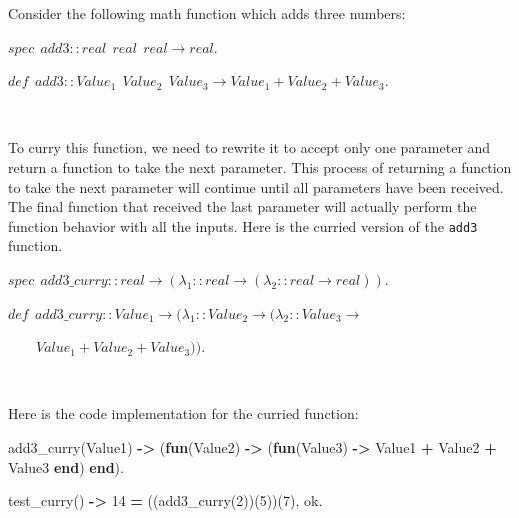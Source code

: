 \documentclass[
]{book}
\newenvironment{Shaded}{\begin{snugshade}}{\end{snugshade}}
\newcommand{\CharTok}[1]{\textcolor[rgb]{0.31,0.60,0.02}{#1}}
\newcommand{\DecValTok}[1]{\textcolor[rgb]{0.00,0.00,0.81}{#1}}
\newcommand{\FunctionTok}[1]{\textcolor[rgb]{0.00,0.00,0.00}{#1}}
\newcommand{\KeywordTok}[1]{\textcolor[rgb]{0.13,0.29,0.53}{\textbf{#1}}}
\newcommand{\OperatorTok}[1]{\textcolor[rgb]{0.81,0.36,0.00}{\textbf{#1}}}
\newcommand{\VariableTok}[1]{\textcolor[rgb]{0.00,0.00,0.00}{#1}}
\begin{document}
Consider the following math function which adds three numbers:

\begin{formulabox}
\(spec ~ ~ add3 :: real ~ ~ real ~ ~ real \rightarrow real.\)

\(de\mathit{f} ~ ~ add3 :: Value_1 ~ ~ Value_2 ~ ~ Value_3 \rightarrow Value_1 + Value_2 + Value_3.\)

\end{formulabox}

\(\nonumber\)

To curry this function, we need to rewrite it to accept only one parameter and return a function to take the next parameter. This process of returning a function to take the next parameter will continue until all parameters have been received. The final function that received the last parameter will actually perform the function behavior with all the inputs. Here is the curried version of the \texttt{add3} function.

\begin{formulabox}
\(spec ~ ~ add3\_curry :: real \rightarrow (\lambda_1 :: real \rightarrow (\lambda_2 :: real \rightarrow real)).\)

\(de\mathit{f} ~ ~ add3\_curry :: Value_1 \rightarrow (\lambda_1 :: Value_2 \rightarrow (\lambda_2 :: Value_3 \rightarrow\)

\(\quad \quad Value_1 + Value_2 + Value_3)).\)

\end{formulabox}

\(\nonumber\)

Here is the code implementation for the curried function:

\begin{Shaded}
\begin{Highlighting}[]
\FunctionTok{add3\_curry(}\VariableTok{Value1}\FunctionTok{)} \OperatorTok{{-}\textgreater{}} \FunctionTok{(}\KeywordTok{fun}\FunctionTok{(}\VariableTok{Value2}\FunctionTok{)} \OperatorTok{{-}\textgreater{}} \FunctionTok{(}\KeywordTok{fun}\FunctionTok{(}\VariableTok{Value3}\FunctionTok{)} \OperatorTok{{-}\textgreater{}} \VariableTok{Value1} \OperatorTok{+} \VariableTok{Value2} \OperatorTok{+} \VariableTok{Value3} \KeywordTok{end}\FunctionTok{)} \KeywordTok{end}\FunctionTok{).}

\FunctionTok{test\_curry()} \OperatorTok{{-}\textgreater{}}
    \DecValTok{14} \OperatorTok{=} \FunctionTok{((add3\_curry(}\DecValTok{2}\FunctionTok{))(}\DecValTok{5}\FunctionTok{))(}\DecValTok{7}\FunctionTok{),}
    \CharTok{ok}\FunctionTok{.}
\end{Highlighting}
\end{Shaded}
\end{document}
